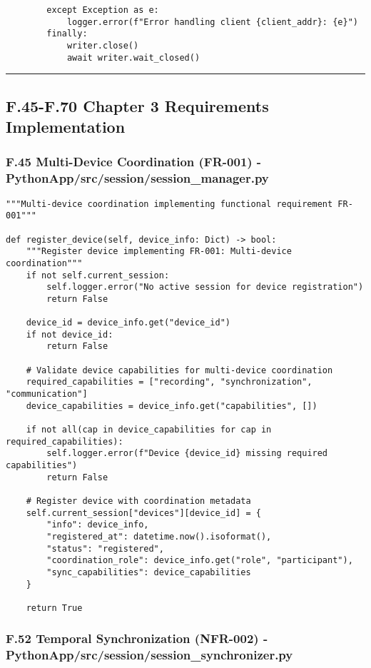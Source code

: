 \documentclass[12pt,a4paper]{article}
\begin{document}
{{\begin{verbatim}
        except Exception as e:
            logger.error(f"Error handling client {client_addr}: {e}")
        finally:
            writer.close()
            await writer.wait_closed()
\end{verbatim}

\hrule

\subsection{F.45-F.70 Chapter 3 Requirements Implementation}

\subsubsection{F.45 Multi-Device Coordination (FR-001) - PythonApp/src/session/session_manager.py}

\begin{verbatim}
"""Multi-device coordination implementing functional requirement FR-001"""

def register_device(self, device_info: Dict) -> bool:
    """Register device implementing FR-001: Multi-device coordination"""
    if not self.current_session:
        self.logger.error("No active session for device registration")
        return False
    
    device_id = device_info.get("device_id")
    if not device_id:
        return False
    
    # Validate device capabilities for multi-device coordination
    required_capabilities = ["recording", "synchronization", "communication"]
    device_capabilities = device_info.get("capabilities", [])
    
    if not all(cap in device_capabilities for cap in required_capabilities):
        self.logger.error(f"Device {device_id} missing required capabilities")
        return False
    
    # Register device with coordination metadata
    self.current_session["devices"][device_id] = {
        "info": device_info,
        "registered_at": datetime.now().isoformat(),
        "status": "registered",
        "coordination_role": device_info.get("role", "participant"),
        "sync_capabilities": device_capabilities
    }
    
    return True
\end{verbatim}

\subsubsection{F.52 Temporal Synchronization (NFR-002) - PythonApp/src/session/session_synchronizer.py}

}}
\end{document}
